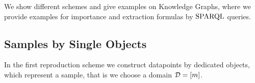 We show different schemes and give examples on Knowledge Graphs, where we provide examples for importance and extraction formulas by $\mathrm{SPARQL}$ queries.


%



%



\subsection{Samples by Single Objects}


In the first reproduction scheme we construct datapoints by dedicated objects, which represent a sample, that is we choose a domain $\mathcal{D}=[m]$.

